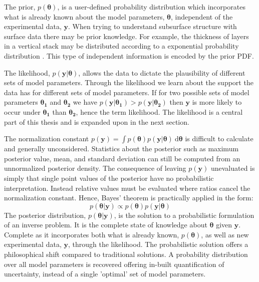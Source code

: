 The prior, $p(\bm{\theta})$, is a user-defined probability distribution which incorporates what is already known about the model parameters, $\bm{\theta}$, independent of the experimental data, $\bm{y}$. When trying to understand subsurface structure with surface data there may be prior knowledge. For example, the thickness of layers in a vertical stack may be distributed according to a exponential probability distribution \citep{Mosegaard1995}. This type of independent information is encoded by the prior PDF.\par

The likelihood, $p(\bm{y}|\bm{\theta})$, allows the data to dictate the plausibility of different sets of model parameters. Through the likelihood we learn about the support the data has for different sets of model parameters. If for two possible sets of model parameters $\bm{\theta_1}$ and $\bm{\theta_2}$ we have $p(\bm{y}|\bm{\theta_1}) > p(\bm{y}|\bm{\theta_2})$ then $\bm{y}$ is more likely to occur under $\bm{\theta_1}$ than $\bm{\theta_2}$, hence the term likelihood. The likelihood is a central part of this thesis and is expanded upon in the next section.\par

The normalization constant $p(\bm{y}) = \int p(\bm{\theta}) p(\bm{y}|\bm{\theta})\ \text{d}\bm{\theta}$ is difficult to calculate and generally unconsidered. Statistics about the posterior such as maximum posterior value, mean, and standard deviation can still be computed from an unnormalized posterior density. The consequence of leaving $p(\bm{y})$ unevaluated is simply that single point values of the posterior have no probabilistic interpretation. Instead relative values must be evaluated where ratios cancel the normalization constant. Hence, Bayes' theorem is practically applied in the form:
\begin{equation}
p(\bm{\theta}|\bm{y}) \propto p(\bm{\theta}) p(\bm{y}|\bm{\theta})
\label{applied_bayes}	
\end{equation}
The posterior distribution, $p(\bm{\theta}|\bm{y})$, is the solution to a probabilistic formulation of an inverse problem. It is the complete state of knowledge about $\bm{\theta}$ given $\bm{y}$. Complete as it incorporates both what is already known, $p(\bm{\theta})$, as well as new experimental data, $\bm{y}$, through the likelihood. The probabilistic solution offers a philosophical shift compared to traditional solutions. A probability distribution over all model parameters is recovered offering in-built quantification of uncertainty, instead of a single 'optimal' set of model parameters. \par

